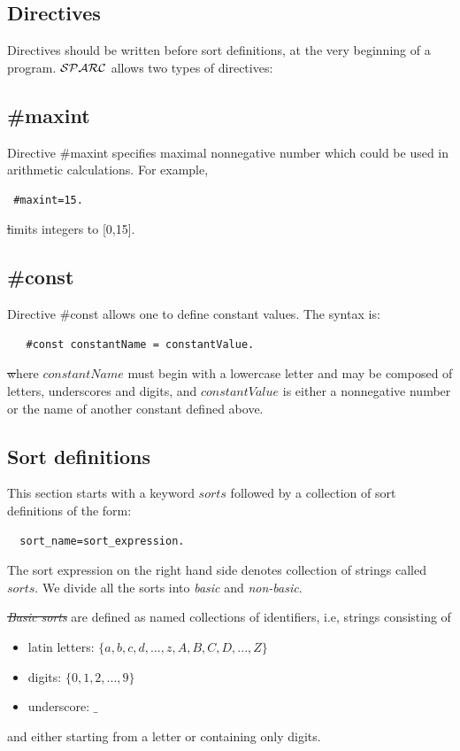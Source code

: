 \documentclass[12pt, letterpaper]{article}
\begin{document}
\subsection{Directives}
Directives should be written before sort definitions, at the very beginning of a program.
${\cal SPARC}$ allows two types of directives:
\subsection*{\#maxint}
Directive \#maxint specifies maximal nonnegative number which could be used in arithmetic calculations. For example,
\begin{verbatim}
 #maxint=15.
\end{verbatim}
\st limits integers to [0,15].
\subsection*{\#const}
Directive \#const allows one to define constant values. The syntax is:

\begin{verbatim}
   #const constantName = constantValue.
\end{verbatim}      
\st where $constantName$  must begin with a lowercase letter and may be composed of letters, underscores and digits,
 and $constantValue$ is either a nonnegative number or the name of another constant defined above.  


\subsection{Sort definitions}\label{ss}

This section starts with a keyword $sorts$ followed by a collection of sort definitions of the form:

\begin{verbatim}
  sort_name=sort_expression.
\end{verbatim}

The sort expression on the right hand side denotes collection of strings called $sorts$. We divide all the sorts into \textit{basic} and \textit{non-basic}. 

\st \textit{Basic sorts} are defined as named collections of identifiers, i.e, strings consisting of
\begin{itemize}
 \item latin letters: $\{a,b,c,d,...,z,A,B,C,D,...,Z\}$
 \item digits: $\{0,1,2,...,9\}$
 \item underscore: $\_$
\end{itemize}
and either starting from a letter or containing only digits.
\end{document}
